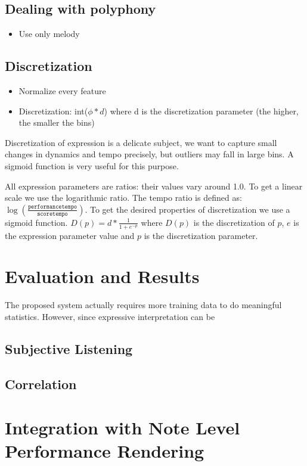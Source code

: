 \documentclass[a4paper,10pt]{article}
\begin{document}
\subsection{Dealing with polyphony}
\begin{itemize}
\item Use only melody
\end{itemize}
\subsection{Discretization}

\begin{itemize}
\item Normalize every feature
\item Discretization: int($\phi * d$) where d is the discretization parameter (the higher, the smaller the bins)
\end{itemize}

Discretization of expression is a delicate subject, we want to capture small changes in dynamics and tempo precisely, but outliers may fall in large bins. A sigmoid function is very useful for this purpose. 

All expression parameters are ratios: their values vary around 1.0. To get a linear scale we use the logarithmic ratio. The tempo ratio is defined as: $\log(\frac{\texttt{performancetempo}}{\texttt{scoretempo}})$. To get the desired properties of discretization we use a sigmoid function. $D(p) = d * \frac{1}{1+e^{-p}}$ where $D(p)$ is the discretization of $p$, $e$ is the expression parameter value and $p$ is the discretization parameter.

\section{Evaluation and Results}
The proposed system actually requires more training data to do meaningful statistics. However, since expressive interpretation can be 
\subsection{Subjective Listening}
\subsection{Correlation}
\section{Integration with Note Level Performance Rendering}
\end{document}
